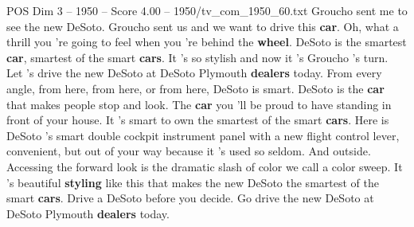 \begin{textsample}{POS Dim 3 – 1950 – Score 4.00 – 1950/tv\_com\_1950\_60.txt}  \label{ex:f3_pos_013}
Groucho sent me to see the new DeSoto.
Groucho sent us and we want to drive this \textbf{car}.
Oh, what a thrill you 're going to feel when you 're behind the \textbf{wheel}.
DeSoto is the smartest \textbf{car}, smartest of the smart \textbf{cars}.
It 's so stylish and now it 's Groucho 's turn.
Let 's drive the new DeSoto at DeSoto Plymouth \textbf{dealers} today.
From every angle, from here, from here, or from here, DeSoto is smart.
DeSoto is the \textbf{car} that makes people stop and look.
The \textbf{car} you 'll be proud to have standing in front of your house.
It 's smart to own the smartest of the smart \textbf{cars}.
Here is DeSoto 's smart double cockpit instrument panel with a new flight control lever, convenient, but out of your way because it 's used so seldom.
And outside.
Accessing the forward look is the dramatic slash of color we call a color sweep.
It 's beautiful \textbf{styling} like this that makes the new DeSoto the smartest of the smart \textbf{cars}.
Drive a DeSoto before you decide.
Go drive the new DeSoto at DeSoto Plymouth \textbf{dealers} today.

\end{textsample}
